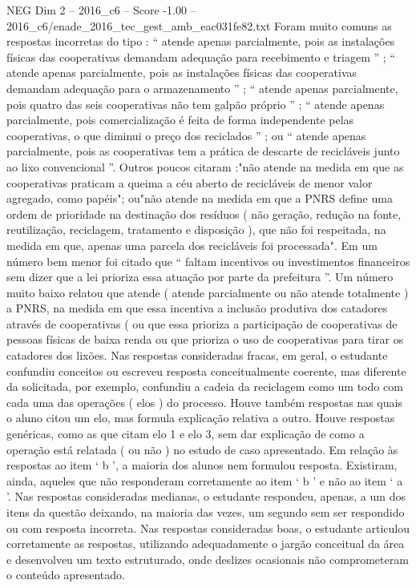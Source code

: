 \begin{textsample}{NEG Dim 2 – 2016\_c6 – Score -1.00 – 2016\_c6/enade\_2016\_tec\_gest\_amb\_eac031fe82.txt}
Foram muito comuns as respostas incorretas do tipo : “ atende apenas parcialmente, pois as instalações físicas das cooperativas demandam adequação para recebimento e triagem ” ; “ atende apenas parcialmente, pois as instalações físicas das cooperativas demandam adequação para o armazenamento ” ; “ atende apenas parcialmente, pois quatro das seis cooperativas não tem galpão próprio ” ; “ atende apenas parcialmente, pois comercialização é feita de forma independente pelas cooperativas, o que diminui o preço dos reciclados ” ; ou “ atende apenas parcialmente, pois as cooperativas tem a prática de descarte de recicláveis junto ao lixo convencional ”.
Outros poucos citaram :"não atende na medida em que as cooperativas praticam a queima a céu aberto de recicláveis de menor valor agregado, como papéis"; ou"não atende na medida em que a PNRS define uma ordem de prioridade na destinação dos resíduos ( não geração, redução na fonte, reutilização, reciclagem, tratamento e disposição ), que não foi respeitada, na medida em que, apenas uma parcela dos recicláveis foi processada".
Em um número bem menor foi citado que “ faltam incentivos ou investimentos financeiros sem dizer que a lei prioriza essa atuação por parte da prefeitura ”.
Um número muito baixo relatou que atende ( atende parcialmente ou não atende totalmente ) a PNRS, na medida em que essa incentiva a inclusão produtiva dos catadores através de cooperativas ( ou que essa prioriza a participação de cooperativas de pessoas físicas de baixa renda ou que prioriza o uso de cooperativas para tirar os catadores dos lixões.
Nas respostas consideradas fracas, em geral, o estudante confundiu conceitos ou escreveu resposta conceitualmente coerente, mas diferente da solicitada, por exemplo, confundiu a cadeia da reciclagem como um todo com cada uma das operações ( elos ) do processo.
Houve também respostas nas quais o aluno citou um elo, mas formula explicação relativa a outro.
Houve respostas genéricas, como as que citam elo 1 e elo 3, sem dar explicação de como a operação está relatada ( ou não ) no estudo de caso apresentado.
Em relação às respostas ao item ‘ b ’, a maioria dos alunos nem formulou resposta.
Existiram, ainda, aqueles que não responderam corretamente ao item ‘ b ’ e não ao item ‘ a ’.
Nas respostas consideradas medianas, o estudante respondeu, apenas, a um dos itens da questão deixando, na maioria das vezes, um segundo sem ser respondido ou com resposta incorreta.
Nas respostas consideradas boas, o estudante articulou corretamente as respostas, utilizando adequadamente o jargão conceitual da área e desenvolveu um texto estruturado, onde deslizes ocasionais não comprometeram o conteúdo apresentado.

\end{textsample}
